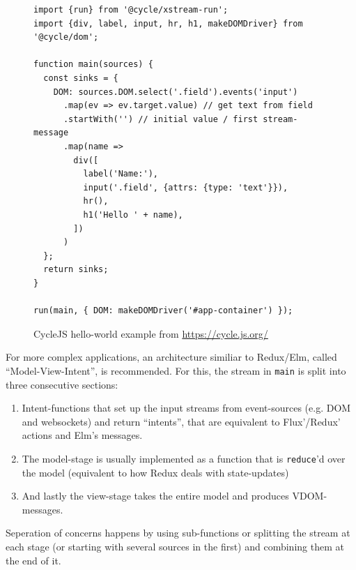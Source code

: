 \begin{figure}
\centering
\begin{verbatim}
import {run} from '@cycle/xstream-run';
import {div, label, input, hr, h1, makeDOMDriver} from '@cycle/dom';

function main(sources) {
  const sinks = {
    DOM: sources.DOM.select('.field').events('input')
      .map(ev => ev.target.value) // get text from field
      .startWith('') // initial value / first stream-message
      .map(name =>
        div([
          label('Name:'),
          input('.field', {attrs: {type: 'text'}}),
          hr(),
          h1('Hello ' + name),
        ])
      )
  };
  return sinks;
}

run(main, { DOM: makeDOMDriver('#app-container') });
\end{verbatim}
\caption{CycleJS hello-world example from \url{https://cycle.js.org/}}
\label{fig:cyclejs}
\end{figure}

For more complex applications, an architecture similiar to Redux/Elm, called ``Model-View-Intent'', is recommended. For this, the stream in \texttt{main} is split into three consecutive sections: 

\begin{enumerate}
\item Intent-functions that set up the input streams from event-sources (e.g. DOM and websockets) and return ``intents'', that are equivalent to Flux'/Redux' actions and Elm's messages.
\item The model-stage is usually implemented as a function that is \texttt{reduce}'d over the model (equivalent to how Redux deals with state-updates)
\item And lastly the view-stage takes the entire model and produces VDOM-messages.
\end{enumerate}

Seperation of concerns happens by using sub-functions or splitting the stream at each stage (or starting with several sources in the first) and combining them at the end of it.

